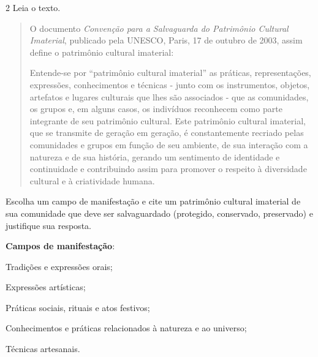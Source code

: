 \begin{escolha}

\num{2}  Leia o texto.

\begin{quote}
O documento \emph{Convenção para a Salvaguarda do Patrimônio Cultural
Imaterial}, publicado pela UNESCO, Paris, 17 de outubro de 2003, assim
define o patrimônio cultural imaterial:

Entende-se por ``patrimônio cultural imaterial'' as práticas,
representações, expressões, conhecimentos e técnicas - junto com os
instrumentos, objetos, artefatos e lugares culturais que lhes são
associados - que as comunidades, os grupos e, em alguns casos, os
indivíduos reconhecem como parte integrante de seu patrimônio cultural.
Este patrimônio cultural imaterial, que se transmite de geração em
geração, é constantemente recriado pelas comunidades e grupos em função
de seu ambiente, de sua interação com a natureza e de sua história,
gerando um sentimento de identidade e continuidade e contribuindo assim
para promover o respeito à diversidade cultural e à criatividade humana.

\end{quote}

Escolha um campo de manifestação e cite um patrimônio cultural imaterial
de sua comunidade que deve ser salvaguardado (protegido, conservado,
preservado) e justifique sua resposta.

\textbf{Campos de manifestação}:

\begin{escolha}
\item
  Tradições e expressões orais;
\item
  Expressões artísticas;
\item
  Práticas sociais, rituais e atos festivos;
\item
  Conhecimentos e práticas relacionados à natureza e ao universo;
\item
  Técnicas artesanais.
\end{escolha}


\end{escolha}
